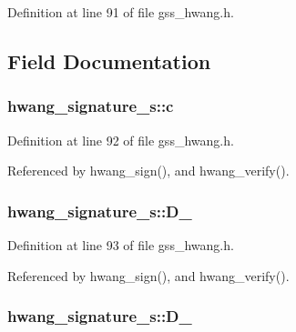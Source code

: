 Definition at line 91 of file gss\-\_\-hwang.\-h.



\subsection{Field Documentation}
\hypertarget{structhwang__signature__s_a7fb1cb6824c1df972043f43d38a6b4ac}{
\subsubsection[{c}]{ hwang\-\_\-signature\-\_\-s\-::c}}\label{structhwang__signature__s_a7fb1cb6824c1df972043f43d38a6b4ac}


Definition at line 92 of file gss\-\_\-hwang.\-h.



Referenced by hwang\-\_\-sign(), and hwang\-\_\-verify().

\hypertarget{structhwang__signature__s_af27fdffc6e81e237f52c3ff916f0b4c8}{
\subsubsection[{D\-\_\-1}]{ hwang\-\_\-signature\-\_\-s\-::\-D\-\_}}\label{structhwang__signature__s_af27fdffc6e81e237f52c3ff916f0b4c8}


Definition at line 93 of file gss\-\_\-hwang.\-h.



Referenced by hwang\-\_\-sign(), and hwang\-\_\-verify().

\hypertarget{structhwang__signature__s_a80e13d38590e1276886908554a7cd755}{
\subsubsection[{D\-\_\-2}]{ hwang\-\_\-signature\-\_\-s\-::\-D\-\_}}\label{structhwang__signature__s_a80e13d38590e1276886908554a7cd755}


